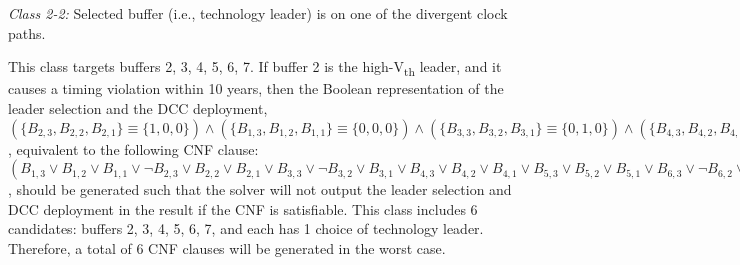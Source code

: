 \begin{class}
\textit{Class 2-2:} Selected buffer (i.e., technology leader) is on one of the divergent clock paths.

This class targets buffers 2, 3, 4, 5, 6, 7. If buffer 2 is the high-V\textsubscript{th} leader, and it causes a timing violation within 10 years, then the Boolean representation of the leader selection and the DCC deployment, 
{\fontsize{7}{8.4}$\left(\{B_{2,3}, B_{2,2}, B_{2,1}\} \equiv \{1, 0, 0\} \right) \land \left( \{B_{1,3}, B_{1,2}, B_{1,1}\} \equiv \{0, 0, 0\} \right) \land \left( \{B_{3,3}, B_{3,2}, B_{3,1}\} \equiv \{0, 1, 0\} \right) \land \left( \{B_{4,3}, B_{4,2}, B_{4,1}\} \equiv \{0, 0, 0\} \right) \land \left( \{B_{5,3}, B_{5,2}, B_{5,1}\} \equiv \{0, 0, 0\} \right) \land \left( \{B_{6,3}, B_{6,2}, B_{6,1}\} \equiv \{0, 1, 1\} \right) \land \left( \{B_{7,3}, B_{7,2}, B_{7,1}\} \equiv \{0, 0, 0\} \right)$}, equivalent to the following CNF clause: 
{\fontsize{7}{8.4}$(B_{1,3} \lor B_{1,2} \lor B_{1,1} \lor \neg B_{2,3} \lor B_{2,2} \lor B_{2,1} \lor B_{3,3} \lor \neg B_{3,2} \lor B_{3,1} \lor B_{4,3} \lor B_{4,2} \lor B_{4,1} \lor B_{5,3} 
\lor B_{5,2} \lor B_{5,1} \lor B_{6,3} \lor \neg B_{6,2} \lor  \neg B_{6,1} \lor B_{7,3} \lor B_{7,2} \lor B_{7,1} )$}, should be generated such that the solver will not output the leader selection and DCC deployment in the result if the CNF is satisfiable. This class includes 6 candidates: buffers 2, 3, 4, 5, 6, 7, and each has 1 choice of technology leader. Therefore, a total of 6 CNF clauses will be generated in the worst case.
\end{class}
